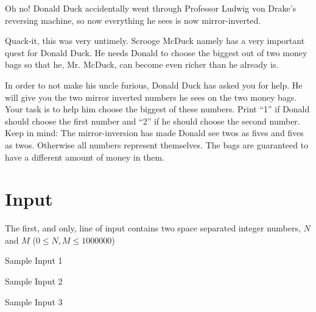 Oh no! Donald Duck accidentally went through Professor Ludwig von Drake’s reversing machine, so now everything he sees is now mirror-inverted.

Quack-it, this was very untimely. Scrooge McDuck namely has a very important quest for Donald Duck. He needs Donald to choose the biggest out of two money bags so that he, Mr. McDuck, can become even richer than he already is.

In order to not make his uncle furious, Donald Duck has asked you for help. He will give you the two
mirror inverted numbers he sees on the two money bags. Your task is to help him choose the biggest
of these numbers. Print “1” if Donald should choose the first number and “2” if he should choose the
second number. Keep in mind: The mirror-inversion has made Donald see twos as fives and fives as twos. Otherwise all numbers represent themselves. The bags are guaranteed to have a different amount of money in them.

\section*{Input}
The first, and only, line of input contains two space separated integer numbers, $N$ and $M$ ($0
\leq N, M \leq 1 000 000$)

\caption{Sample Input 1}

\caption{Sample Input 2}

\caption{Sample Input 3}
